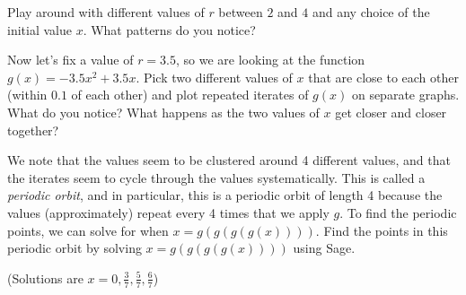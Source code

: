 \documentclass[12pt]{amsart}
\theoremstyle{definition}
\theoremstyle{definition}
\begin{document}
Play around with different values of $r$ between $2$ and $4$ and any
choice of the initial value $x$. What patterns do you notice?

Now let's fix a value of $r=3.5$, so we are looking at the function
$g(x)=-3.5x^2+3.5x$. Pick two different values of $x$ that are close to each other 
(within $0.1$ of each other) and plot repeated iterates of $g(x)$ on separate
graphs. What do you notice?
What happens as the two values of $x$ get closer and closer together?

We note that the values seem to be clustered around 4 different values,
and that the iterates seem to cycle through the values systematically. This is called
a \textit{periodic orbit}, and in particular, this is a periodic orbit of length 4 because
the values (approximately) repeat every 4 times that we apply $g$. To find
the periodic points, we can solve for when $x=g(g(g(g(x))))$. Find the points
in this periodic orbit by solving $x=g(g(g(g(x))))$ using Sage.

(Solutions are $x=0, \frac{3}{7}, \frac{5}{7}, \frac{6}{7}$)
\end{document}
